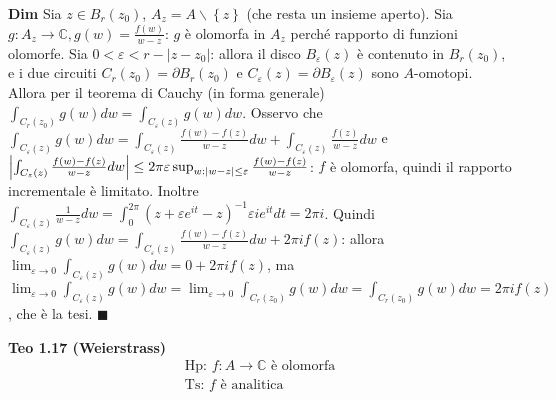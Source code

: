 \documentclass{article}
\begin{document}
\textbf{Dim} Sia $z\in B_{r}\left( z_{0}\right) $, $A_{z}=A\backslash
\left\{ z\right\} $ (che resta un insieme aperto). Sia $g:A_{z}\rightarrow 
\mathbb{C}
,g\left( w\right) =\frac{f\left( w\right) }{w-z}$: $g$ \`{e} olomorfa in $%
A_{z}$ perch\'{e} rapporto di funzioni olomorfe. Sia $0<\varepsilon
<r-\left\vert z-z_{0}\right\vert $: allora il disco $B_{\varepsilon }\left(
z\right) $ \`{e} contenuto in $B_{r}\left( z_{0}\right) $, e i due circuiti $%
C_{r}\left( z_{0}\right) =\partial B_{r}\left( z_{0}\right) $ e $%
C_{\varepsilon }\left( z\right) =\partial B_{\varepsilon }\left( z\right) $
sono $A$-omotopi. Allora per il teorema di Cauchy (in forma generale) $%
\int_{C_{r}\left( z_{0}\right) }g\left( w\right) dw=\int_{C_{\varepsilon
}\left( z\right) }g\left( w\right) dw$. Osservo che $\int_{C_{\varepsilon
}\left( z\right) }g\left( w\right) dw=\int_{C_{\varepsilon }\left( z\right) }%
\frac{f\left( w\right) -f\left( z\right) }{w-z}dw+\int_{C_{\varepsilon
}\left( z\right) }\frac{f\left( z\right) }{w-z}dw$ e $\left\vert
\int_{C_{\varepsilon }\left( z\right) }\frac{f\left( w\right) -f\left(
z\right) }{w-z}dw\right\vert \leq 2\pi \varepsilon \sup_{w:\left\vert
w-z\right\vert \leq \varepsilon }\frac{f\left( w\right) -f\left( z\right) }{%
w-z}$: $f$ \`{e} olomorfa, quindi il rapporto incrementale \`{e} limitato.
Inoltre $\int_{C_{\varepsilon }\left( z\right) }\frac{1}{w-z}%
dw=\int_{0}^{2\pi }\left( z+\varepsilon e^{it}-z\right) ^{-1}\varepsilon
ie^{it}dt=2\pi i$. Quindi $\int_{C_{\varepsilon }\left( z\right) }g\left(
w\right) dw=\int_{C_{\varepsilon }\left( z\right) }\frac{f\left( w\right)
-f\left( z\right) }{w-z}dw+2\pi if\left( z\right) $: allora $%
\lim_{\varepsilon \rightarrow 0}\int_{C_{\varepsilon }\left( z\right)
}g\left( w\right) dw=0+2\pi if\left( z\right) $, ma $\lim_{\varepsilon
\rightarrow 0}\int_{C_{\varepsilon }\left( z\right) }g\left( w\right)
dw=\lim_{\varepsilon \rightarrow 0}\int_{C_{r}\left( z_{0}\right) }g\left(
w\right) dw=\int_{C_{r}\left( z_{0}\right) }g\left( w\right) dw=2\pi
if\left( z\right) $, che \`{e} la tesi. $\blacksquare $

\textbf{Teo 1.17 (Weierstrass)}%
\begin{gather*}
\text{Hp: }f:A\rightarrow 
\mathbb{C}
\text{ \`{e} olomorfa} \\
\text{Ts: }f\text{ \`{e} analitica}
\end{gather*}
\end{document}
